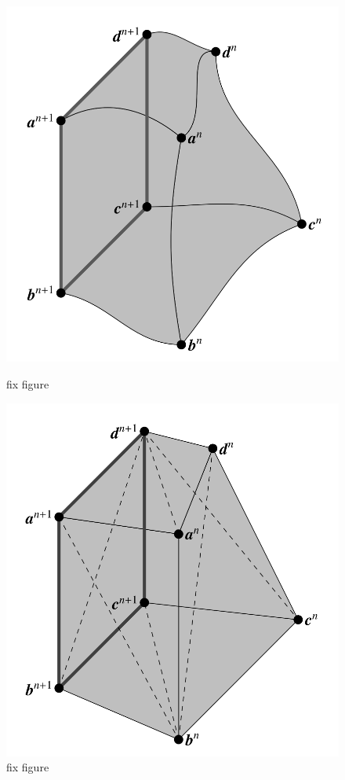  \begin{figure}[htbp]
	\centering
	\begin{minipage}{.5\textwidth}
		\centering
		\includegraphics[width=1.0\linewidth]{figs/streaktube.png}
		\caption{fix figure}
		\label{fig:streak}
	\end{minipage}%
	\begin{minipage}{0.5\textwidth}
		\centering
		\includegraphics[width=1.0\linewidth]{figs/simplicies}
		\caption{fix figure}
		\label{fig:simp}
	\end{minipage}
\end{figure}

